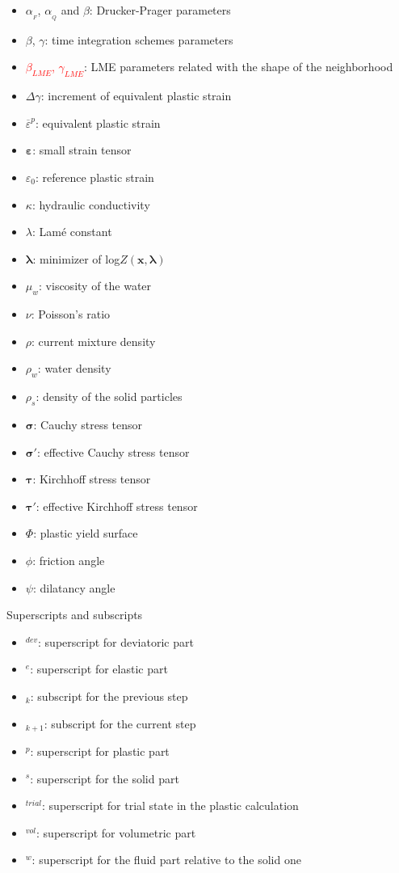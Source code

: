 \documentclass[twocolumn]{svjour3}          %
\begin{document}
\begin{itemize}
\item $\alpha_{_F}$, $\alpha_{_Q}$ and $\beta$: Drucker-Prager parameters
\item $\beta$, $\gamma$: time integration schemes parameters
\item \textcolor{red}{$\beta_{LME}$, $\gamma_{LME}$}: LME parameters related with the shape of the neighborhood
\item $\Delta\gamma$: increment of equivalent plastic strain
\item $\overline{\varepsilon}^p$: equivalent plastic strain
\item $\boldsymbol{\varepsilon}$: small strain tensor
\item  $\varepsilon_0$: reference plastic strain
\item $\kappa$: hydraulic conductivity
\item $\lambda$: Lam\'e constant
\item $\boldsymbol{\lambda}$: minimizer of log$Z(\boldsymbol{x},\boldsymbol{\lambda})$
\item  $\mu_w $: viscosity of the water
\item $\nu$: Poisson's ratio
\item $\rho$: current mixture density
\item $\rho_w$: water density
\item $\rho_s$: density of the solid particles
\item $\boldsymbol{\sigma}$: Cauchy stress tensor
\item $\boldsymbol{\sigma'}$: effective Cauchy stress tensor
\item $\boldsymbol{\tau}$: Kirchhoff stress tensor
\item $\boldsymbol{\tau'}$: effective Kirchhoff stress tensor
\item $\Phi$: plastic yield surface
\item  $\phi$: friction angle
\item $\psi$: dilatancy angle
\\
\end{itemize}

Superscripts and subscripts
\begin{itemize}
\item$^{dev}$: superscript for deviatoric part
\item$^{e}$: superscript for elastic part
\item$_{k}$: subscript for the previous step
\item$_{k+1}$: subscript for the current step
\item$^{p}$: superscript for plastic part
\item$^{s}$: superscript for the solid part
\item$^{trial}$: superscript for trial state in the plastic calculation
\item$^{vol}$: superscript for volumetric part
\item$^{w}$: superscript for the fluid part relative to the solid one
\end{itemize}
\end{document}
